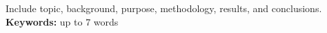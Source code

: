 Include topic, background, purpose, methodology, results, and conclusions.\\
\textbf{Keywords:} up to 7 words